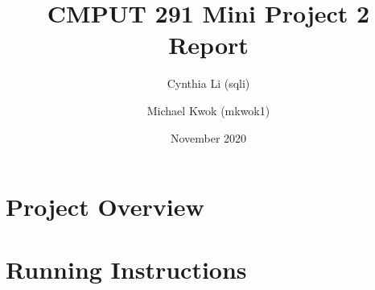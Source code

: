 \documentclass{article}
\title{CMPUT 291 Mini Project 2 Report}
\date{November 2020}
\author{Cynthia Li (sqli)\\
\and Michael Kwok (mkwok1)}
\begin{document}
\maketitle

\section{Project Overview}








\section{Running Instructions}
\end{document}
